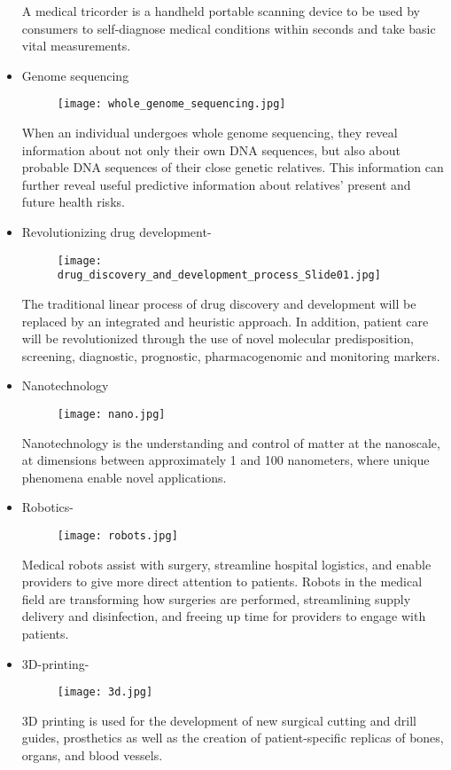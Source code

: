 \documentclass[11pt]{article}
\begin{document}
\begin{itemize}
A medical tricorder is a handheld portable scanning device to be used by consumers to self-diagnose medical conditions within seconds and take basic vital measurements.
\item Genome sequencing
 \begin{figure}[h]
\centering \texttt{[image: whole\_genome\_sequencing.jpg]}
\end{figure}
 When an individual undergoes whole genome sequencing, they reveal information about not only their own DNA sequences, but also about probable DNA sequences of their close genetic relatives. This information can further reveal useful predictive information about relatives' present and future health risks.
\item Revolutionizing drug development-
\begin{figure}[h]
\centering \texttt{[image: drug\_discovery\_and\_development\_process\_Slide01.jpg]}
\end{figure}

The traditional linear process of drug discovery and development will be replaced by an integrated and heuristic approach. In addition, patient care will be revolutionized through the use of novel molecular predisposition, screening, diagnostic, prognostic, pharmacogenomic and monitoring markers.

\item Nanotechnology
\begin{figure}[h]
\centering \texttt{[image: nano.jpg]}
\end{figure}
Nanotechnology is the understanding and control of matter at the nanoscale, at dimensions between approximately 1 and 100 nanometers, where unique phenomena enable novel applications.

\item Robotics-
 \begin{figure}[h]
\centering \texttt{[image: robots.jpg]}
\end{figure}
 Medical robots assist with surgery, streamline hospital logistics, and enable providers to give more direct attention to patients. Robots in the medical field are transforming how surgeries are performed, streamlining supply delivery and disinfection, and freeing up time for providers to engage with patients.
\item 3D-printing-

\begin{figure}[h]
\centering \texttt{[image: 3d.jpg]}
\end{figure}

3D printing is used for the development of new surgical cutting and drill guides, prosthetics as well as the creation of patient-specific replicas of bones, organs, and blood vessels. 
\end{itemize}
\end{document}
